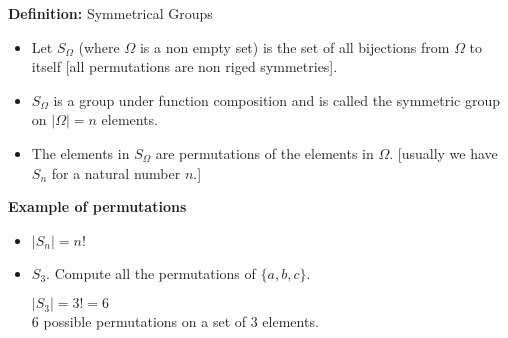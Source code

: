 \documentclass{article}
\begin{document}
\textbf{Definition:} Symmetrical Groups
\begin{itemize}
    \item Let \(S_\Omega\) (where \(\Omega\) is a non empty set) is the set of all bijections from \(\Omega\) to itself [all permutations are non riged symmetries].
    \item \(S_\Omega\) is a group under function composition and is called the symmetric group on \(|\Omega|=n\) elements.
    \item The elements in \(S_\Omega\) are permutations of the elements in \(\Omega\). [usually we have \(S_n\) for a natural number \(n\).]\\
\end{itemize}

\centerline{\textbf{Example of permutations}}
\begin{itemize}
    \item \(|S_n|=n!\)
    \item \(S_3\). Compute all the permutations of \(\{a,b,c\}\). \begin{center}
        \(|S_3|=3!=6\)\\
        6 possible permutations on a set of 3 elements.
    \end{center}
\end{itemize}
\end{document}
